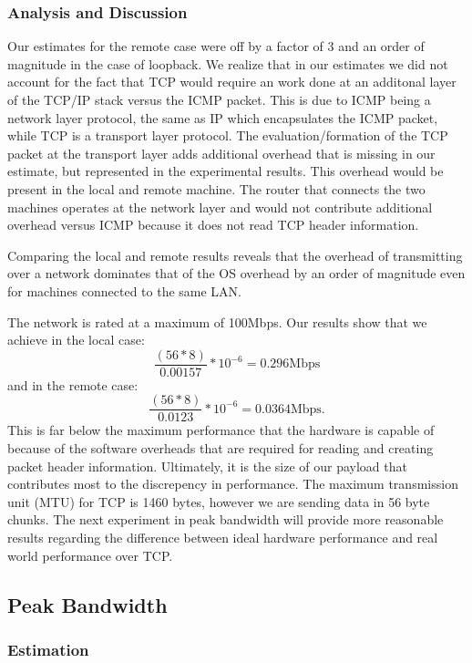 \subsubsection{Analysis and Discussion}

Our estimates for the remote case were off by a factor of 3 and an order of
magnitude in the case of loopback. We realize that in our estimates we did not
account for the fact that TCP would require an work done at an additonal layer
of the TCP/IP stack versus the ICMP packet. This is due to ICMP being a network 
layer protocol, the same as IP which encapsulates the ICMP packet, while TCP is 
a transport layer protocol. The evaluation/formation of the TCP packet at the
transport layer adds additional overhead that is missing in our estimate, but 
represented in the experimental results. This overhead would be present in the 
local and remote machine. The router that connects the two machines operates 
at the network layer and would not contribute additional overhead versus ICMP 
because it does not read TCP header information.

Comparing the local and remote results reveals that the overhead of transmitting
over a network dominates that of the OS overhead by an order of magnitude 
even for machines connected to the same LAN.

The network is rated at a maximum of 100Mbps. Our results show that we achieve in 
the local case: $$\frac{(56*8)}{0.00157} * 10^{-6} = 0.296\text{Mbps}$$
and in the remote case: $$\frac{(56*8)}{0.0123} * 10^{-6} = 0.0364\text{Mbps}.$$
This is far below the maximum performance that the hardware is capable of because of
 the software overheads that are required for reading and creating packet header information.
Ultimately, it is the size of our payload that contributes most to the discrepency 
in performance. The maximum transmission unit (MTU) for TCP is 1460 bytes, 
however we are sending data in 56 byte chunks. The next experiment in peak bandwidth 
will provide more reasonable results regarding the difference between ideal 
hardware performance and real world performance over TCP.

\subsection{Peak Bandwidth}

\subsubsection{Estimation}

